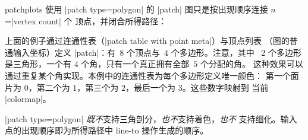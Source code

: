 {\begin{pgfplotslibrary}{patchplots}
使用 |patch type=polygon| 的 |patch| 图只是按出现顺序连接 $n$=|vertex count| 个
顶点，并闭合所得路径：
%
\begin{codeexample}[]
\end{codeexample}
%
\noindent 上面的例子通过连通性表（|patch table with point meta|）与顶点列表
（图的普通输入坐标）定义 |patch|：有~$8$ 个顶点与~$4$ 个多边形。注意，其中
~$2$ 个多边形是三角形，一个有 $4$ 个角，只有一个真正拥有全部~$5$ 个分配的角。
这种效果可以通过重复某个角实现。本例中的连通性表为每个多边形定义唯一颜色：
第一个面片为 $0$，第二个为 $1$，第三个为 $2$，最后一个为 $3$。这些数字映射到
当前 |colormap|。

|patch type=polygon| \emph{既不}支持三角剖分，\emph{也不}支持着色，\emph{也不}
支持细化。输入点的出现顺序即为所得路径中 line-to 操作生成的顺序。



\end{pgfplotslibrary}}
